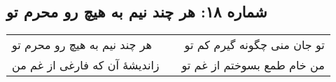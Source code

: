 \begin{center}
\section*{شماره ۱۸: هر چند نیم به هیچ رو محرم تو}
\label{sec:018}
\begin{longtable}{l p{0.5cm} r}
هر چند نیم به هیچ رو محرم تو
&&
تو جان منی چگونه گیرم کم تو
\\
زاندیشهٔ آن که فارغی از غم من
&&
من خام طمع بسوختم از غم تو
\\
\end{longtable}
\end{center}
